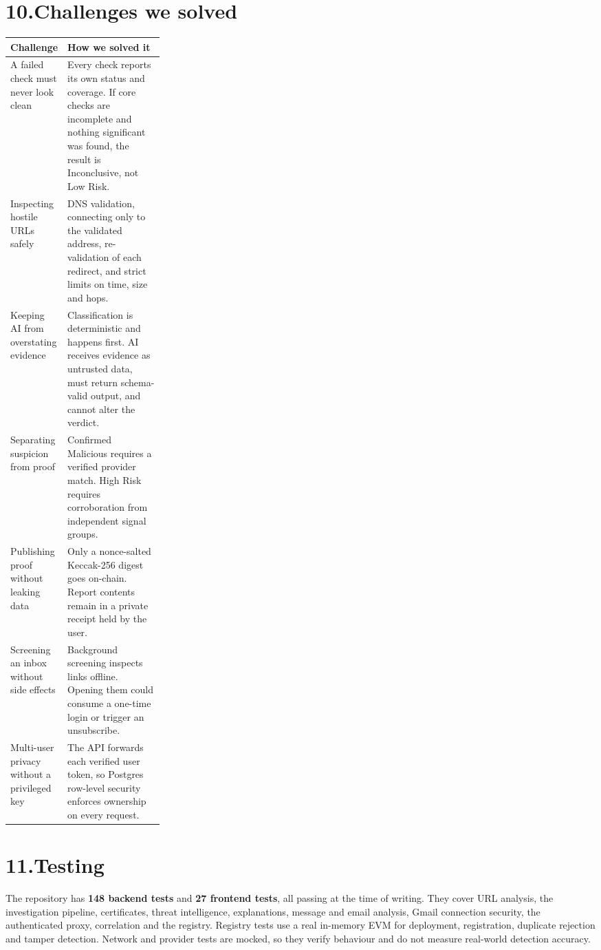 \documentclass[11pt,a4paper]{article}
\begin{document}
\section{10.\quad Challenges we solved}
\begin{tabularx}{\linewidth}{@{}>{\raggedright\arraybackslash}p{0.260\linewidth}>{\raggedright\arraybackslash}X@{}}
\toprule
\textbf{Challenge} & \textbf{How we solved it} \\
\midrule
A failed check must never look clean & Every check reports its own status and coverage. If core checks are incomplete and nothing significant was found, the result is Inconclusive, not Low Risk. \\
Inspecting hostile URLs safely & DNS validation, connecting only to the validated address, re-validation of each redirect, and strict limits on time, size and hops. \\
Keeping AI from overstating evidence & Classification is deterministic and happens first. AI receives evidence as untrusted data, must return schema-valid output, and cannot alter the verdict. \\
Separating suspicion from proof & Confirmed Malicious requires a verified provider match. High Risk requires corroboration from independent signal groups. \\
Publishing proof without leaking data & Only a nonce-salted Keccak-256 digest goes on-chain. Report contents remain in a private receipt held by the user. \\
Screening an inbox without side effects & Background screening inspects links offline. Opening them could consume a one-time login or trigger an unsubscribe. \\
Multi-user privacy without a privileged key & The API forwards each verified user token, so Postgres row-level security enforces ownership on every request. \\
\bottomrule
\end{tabularx}
\vspace{4pt}

\section{11.\quad Testing}
The repository has \textbf{148 backend tests} and \textbf{27 frontend tests}, all passing at the time of writing. They cover URL analysis, the investigation pipeline, certificates, threat intelligence, explanations, message and email analysis, Gmail connection security, the authenticated proxy, correlation and the registry. Registry tests use a real in-memory EVM for deployment, registration, duplicate rejection and tamper detection. Network and provider tests are mocked, so they verify behaviour and do not measure real-world detection accuracy.
\end{document}
